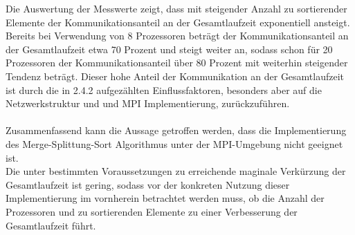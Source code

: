\documentclass[a4paper,12pt]{scrartcl}
\begin{document}
Die Auswertung der Messwerte zeigt, dass mit steigender Anzahl zu sortierender Elemente der Kommunikationsanteil an der Gesamtlaufzeit exponentiell ansteigt.
Bereits bei Verwendung von 8 Prozessoren betr\"agt der Kommunikationsanteil an der Gesamtlaufzeit etwa 70 Prozent und steigt weiter an, sodass schon
f\"ur 20 Prozessoren der Kommunikationsanteil \"uber 80 Prozent mit weiterhin steigender Tendenz betr\"agt.
Dieser hohe Anteil der Kommunikation an der Gesamtlaufzeit ist durch die in 2.4.2 aufgez\"ahlten Einflussfaktoren, besonders aber auf die Netzwerkstruktur und
und MPI Implementierung, zur\"uckzuf\"uhren.\\\\

Zusammenfassend kann die Aussage getroffen werden, dass die Implementierung des Merge-Splittung-Sort Algorithmus unter der MPI-Umgebung nicht geeignet ist.\\
Die unter bestimmten Voraussetzungen zu erreichende maginale Verk\"urzung der Gesamtlaufzeit ist gering, sodass vor der konkreten Nutzung dieser
Implementierung im vornherein betrachtet werden muss, ob die Anzahl der Prozessoren und zu sortierenden Elemente zu einer Verbesserung der Gesamtlaufzeit
f\"uhrt.
\end{document}
